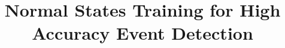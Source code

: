 \documentclass{sig-alternate-05-2015}
\begin{document}



\isbn{***-****-**-***/**/**}



%

\title{Normal States Training for High Accuracy Event Detection}

%
%
%
%
%
\end{document}
